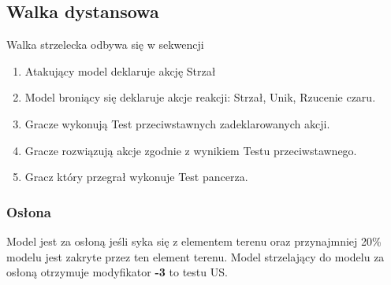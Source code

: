 \subsection{Walka dystansowa}
Walka strzelecka odbywa się w sekwencji
\begin{enumerate}
    \item Atakujący model deklaruje akcję Strzał
    \item Model broniący się deklaruje akcje reakcji: Strzał, Unik, Rzucenie czaru. 
    \item Gracze wykonują Test przeciwstawnych zadeklarowanych akcji.
    \item Gracze rozwiązują akcje zgodnie z wynikiem Testu przeciwstawnego. 
    \item Gracz który przegrał wykonuje Test pancerza.
\end{enumerate}

\subsubsection{Osłona}
Model jest za osłoną jeśli syka się z elementem terenu oraz przynajmniej 20\% modelu jest zakryte przez ten element terenu. Model strzelający do modelu za osłoną otrzymuje modyfikator \textbf{-3} to testu US. 

